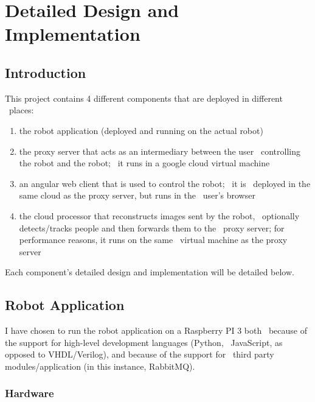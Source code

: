 \chapter{Detailed Design and Implementation}
\label{ch:implementation}

\section{Introduction}
\label{sec:implementation-introduction}
This project contains 4 different components that are deployed in different \
places:
\begin{enumerate}
    \item the robot application (deployed and running on the actual robot)
    \item the proxy server that acts as an intermediary between the user \
            controlling the robot and the robot; \
            it runs in a google cloud virtual machine
    \item an angular web client that is used to control the robot; \
            it is \
            deployed in the same cloud as the proxy server, but runs in the \
            user's browser
    \item the cloud processor that reconstructs images sent by the robot, \
            optionally detects/tracks people and then forwards them to the \
            proxy server; for performance reasons, it runs on the same \
            virtual machine as the proxy server
\end{enumerate}

Each component's detailed design and implementation will be detailed below.

\section{Robot Application}
\label{sec:robot-application}
I have chosen to run the robot application on a Raspberry PI 3 both \
because of the support for high-level development languages (Python, \
JavaScript, as opposed to VHDL/Verilog), and because of the support for \
third party modules/application (in this instance, RabbitMQ).

\subsection{Hardware}
\label{subsec:implementation-robot-hardware}

